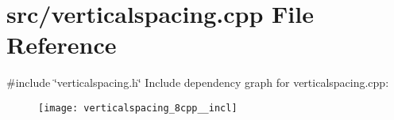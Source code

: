 \section{src/verticalspacing.cpp File Reference}
\label{verticalspacing_8cpp}
{\ttfamily \#include \char`\"{}verticalspacing.\+h\char`\"{}}\newline
Include dependency graph for verticalspacing.\+cpp\+:\nopagebreak
\begin{figure}[H]
\begin{center}
\leavevmode
\texttt{[image: verticalspacing\_8cpp\_\_incl]}
\end{center}
\end{figure}
